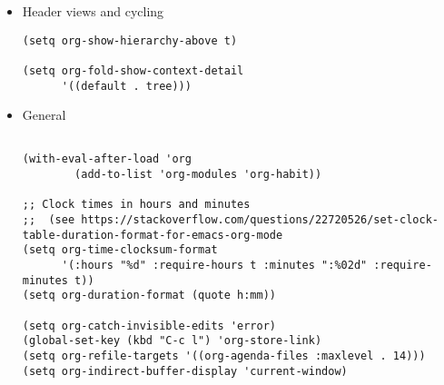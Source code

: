 \documentclass{article}
\begin{document}
\begin{itemize}
\begin{itemize}
\begin{itemize}
\begin{itemize}
\url{https://emacs.stackexchange.com/questions/39390/force-org-to-use-instead-of-begin-example-for-source-block-output}

\begin{verbatim}
(setq org-babel-min-lines-for-block-output 1000)
\end{verbatim}
\item Change noweb wrapper symbols
\label{sec:org6fcd760}
\begin{verbatim}
(setq org-babel-noweb-wrap-start "<#"
      org-babel-noweb-wrap-end "#>")
\end{verbatim}
\item (org-remove-properties-drawer)
\label{sec:org8fde0d1}
\begin{verbatim}
(defun org-remove-properties-drawer ()
  "Remove PROPERTIES drawer from tangled files."
  (save-excursion
    (goto-char (point-min))
    (while (re-search-forward "^# :PROPERTIES:\n\\(?:# .*\n\\)*?# :END:\n" nil t)
      (replace-match ""))))

(add-hook 'org-babel-post-tangle-hook 'org-remove-properties-drawer)
\end{verbatim}
\end{itemize}

\item Header views and cycling
\label{sec:org350231a}
\begin{verbatim}
(setq org-show-hierarchy-above t)

(setq org-fold-show-context-detail
      '((default . tree)))
\end{verbatim}

\item General
\label{sec:orgcf13532}
\begin{verbatim}

(with-eval-after-load 'org
        (add-to-list 'org-modules 'org-habit))

;; Clock times in hours and minutes
;;  (see https://stackoverflow.com/questions/22720526/set-clock-table-duration-format-for-emacs-org-mode
(setq org-time-clocksum-format
      '(:hours "%d" :require-hours t :minutes ":%02d" :require-minutes t))
(setq org-duration-format (quote h:mm))

(setq org-catch-invisible-edits 'error)
(global-set-key (kbd "C-c l") 'org-store-link)
(setq org-refile-targets '((org-agenda-files :maxlevel . 14)))
(setq org-indirect-buffer-display 'current-window)


\end{verbatim}
\end{itemize}
\end{itemize}
\end{itemize}
\end{document}
